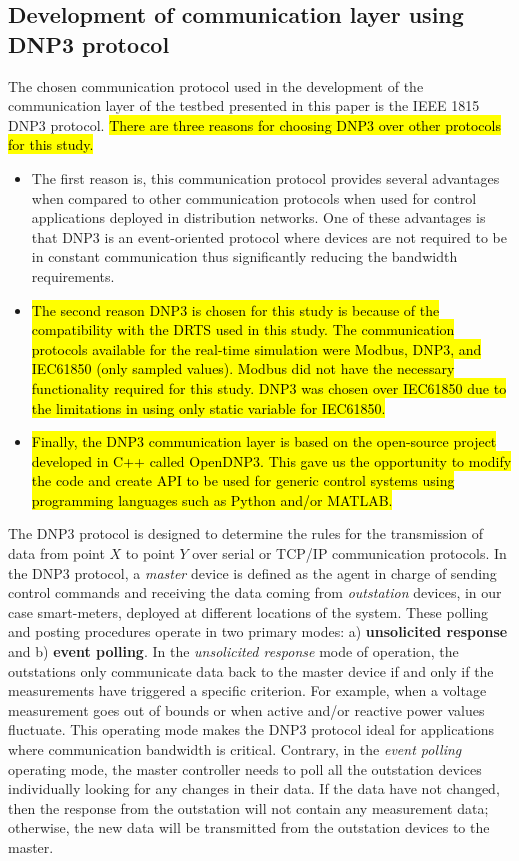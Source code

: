 \subsection{Development of communication layer using DNP3 protocol}
The chosen communication protocol used in the development of the communication layer of the testbed presented in this paper is the IEEE 1815 DNP3 protocol. \hl{There are three reasons for choosing DNP3 over other protocols for this study.} 
\begin{itemize}
    \item The first reason is, this communication protocol provides several advantages when compared to other communication protocols when used for control applications deployed in distribution networks. One of these advantages is that DNP3 is an event-oriented protocol where devices are not required to be in constant communication thus significantly reducing the bandwidth requirements. 
    \item \hl{The second reason DNP3 is chosen for this study is because of the compatibility with the DRTS used in this study. The communication protocols available for the real-time simulation were Modbus, DNP3, and IEC61850 (only sampled values). Modbus did not have the necessary functionality required for this study. DNP3 was chosen over IEC61850 due to the limitations in using only static variable for
    IEC61850.}
    \item \hl{Finally, the DNP3 communication layer is based on the open-source project developed in C++ called OpenDNP3. This gave us the opportunity to modify the code and create API to be used for generic control systems using programming languages such as Python and/or MATLAB.}
\end{itemize}

The DNP3 protocol is designed to determine the rules for the transmission of data from point $X$ to point $Y$ over serial or TCP/IP communication protocols. In the DNP3 protocol, a \textit{master} device is defined as the agent in charge of sending control commands and receiving the data coming from \textit{outstation} devices, in our case smart-meters, deployed at different locations of the system. These polling and posting procedures operate in two primary modes: a) \textbf{unsolicited response} and b) \textbf{event polling}. In the \textit{unsolicited response} mode of operation, the outstations only communicate data back to the master device if and only if the measurements have triggered a specific criterion. For example, when a voltage measurement goes out of bounds or when active and/or reactive power values fluctuate. This operating mode makes the DNP3 protocol ideal for applications where communication bandwidth is critical. Contrary, in the \textit{event polling} operating mode, the master controller needs to poll all the outstation devices individually looking for any changes in their data. If the data have not changed, then the response from the outstation will not contain any measurement data; otherwise, the new data will be transmitted from the outstation devices to the master.

